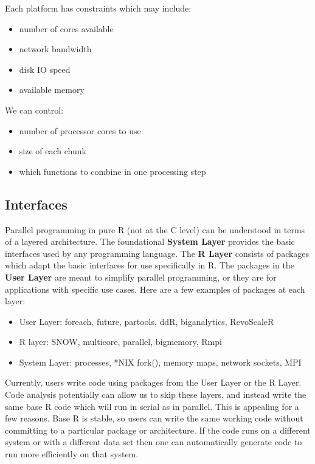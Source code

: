 \documentclass[12pt]{article}
\begin{document}
Each platform has constraints which may include:

\begin{itemize}
    \item number of cores available
    \item network bandwidth
    \item disk IO speed
    \item available memory
\end{itemize}

We can control:

\begin{itemize}
    \item number of processor cores to use
    \item size of each chunk
    \item which functions to combine in one processing step
\end{itemize}

\subsection{Interfaces}

Parallel programming in pure R (not at the C level) can be understood in
terms of a layered architecture. The foundational \textbf{System Layer}
provides the basic interfaces used by any programming language. The
\textbf{R Layer} consists of packages which adapt the basic interfaces for
use specifically in R. The packages in the \textbf{User Layer} are meant to
simplify parallel programming, or they are for applications with specific
use cases.  Here are a few examples of packages at each layer:

\begin{itemize}
\item User Layer: foreach, future, partools, ddR, biganalytics, RevoScaleR
\item R layer: SNOW, multicore, parallel, bigmemory, Rmpi
\item System Layer: processes, *NIX fork(), memory maps, network sockets,
    MPI
\end{itemize}

Currently, users write code using packages from the User Layer or the R
Layer. Code analysis potentially can allow us to skip these layers, and
instead write the same base R code which will run in serial as in parallel.
This is appealing for a few reasons. Base R is stable, so users can write
the same working code without committing to a particular package or
architecture. If the code runs on a different system or with a different
data set then one can automatically generate code to run more efficiently
on that system.
\end{document}
